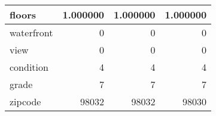 \begin{table}[H]
\begin{tabular}{|l|r|r|r|}
\hline floors & \cellcolor[rgb]{0.9, 0.54, 0.52} 1.000000 & \cellcolor[rgb]{0.9, 0.54, 0.52} 1.000000 & \cellcolor[rgb]{0.9, 0.54, 0.52} 1.000000 \\
\hline waterfront & \cellcolor[rgb]{0.9, 0.54, 0.52} 0 & \cellcolor[rgb]{0.9, 0.54, 0.52} 0 & \cellcolor[rgb]{0.9, 0.54, 0.52} 0 \\
\hline view & \cellcolor[rgb]{0.9, 0.54, 0.52} 0 & \cellcolor[rgb]{0.9, 0.54, 0.52} 0 & \cellcolor[rgb]{0.9, 0.54, 0.52} 0 \\
\hline condition & \cellcolor[rgb]{0.9, 0.54, 0.52} 4 & \cellcolor[rgb]{0.9, 0.54, 0.52} 4 & \cellcolor[rgb]{0.9, 0.54, 0.52} 4 \\
\hline grade & \cellcolor[rgb]{0.9, 0.54, 0.52} 7 & \cellcolor[rgb]{0.9, 0.54, 0.52} 7 & \cellcolor[rgb]{0.9, 0.54, 0.52} 7 \\
\hline zipcode & \cellcolor[rgb]{0.9, 0.54, 0.52} 98032 & \cellcolor[rgb]{0.9, 0.54, 0.52} 98032 & 98030 \\
\hline
\end{tabular}
\end{table}
